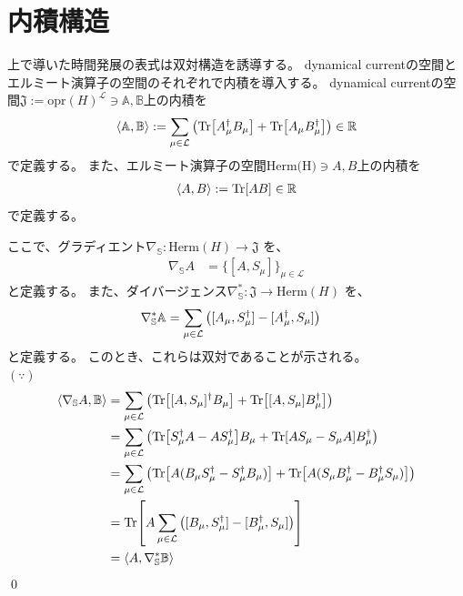\documentclass[a4paper,11pt]{jsarticle}
\numberwithin{equation}{section}
\begin{document}
\section{内積構造}
上で導いた時間発展の表式は双対構造を誘導する。
dynamical currentの空間とエルミート演算子の空間のそれぞれで内積を導入する。
dynamical currentの空間$\mathfrak{J}:= \text{opr}(H)^{\mathcal{L}} \ni \mathbb{A},\mathbb{B}$上の内積を
\begin{align}
    \ev{\mathbb{A} , \mathbb{B}} := \sum_{\mu \in \mathcal{L}} \qty(\Tr[ A_{\mu}^{\dagger} B_{\mu}] + \Tr[A_{\mu} B_{\mu}^{\dagger}]) \in \mathbb{R}
\end{align} 
で定義する。
また、エルミート演算子の空間$\text{Herm(H)} \ni A,B$上の内積を
\begin{align}
    \ev{A, B} := \Tr[A B] \in \mathbb{R}
\end{align}
で定義する。

ここで、グラディエント$\nabla_{\mathbb{S}} : \text{Herm}(H) \to \mathfrak{J}$
を、
\begin{align}
    \nabla_{\mathbb{S}} A &= \{[A, S_{\mu}]\}_{\mu \in \mathcal{L}}
\end{align}
と定義する。
また、ダイバージェンス$\nabla^*_{\mathbb{S}} : \mathfrak{J} \to \text{Herm}(H)$
を、
\begin{align}
    \nabla^*_{\mathbb{S}} \mathbb{A}&=  \sum_{\mu \in \mathcal{L}} \qty([A_{\mu}, S_{\mu}^{\dagger}] - [A_{\mu}^{\dagger}, S_{\mu}])
\end{align}
と定義する。
このとき、これらは双対であることが示される。\\
$(\because)$\\
\begin{align}
    \ev{\nabla_{\mathbb{S}} A , \mathbb{B}} &= \sum_{\mu \in \mathcal{L}} \qty( \Tr[ [A, S_{\mu}]^{\dagger} B_{\mu}] + \Tr[ [A, S_{\mu}] B_{\mu}^{\dagger}]) \\
    &= \sum_{\mu \in \mathcal{L}} \qty( \Tr[ S_{\mu}^{\dagger} A- AS_{\mu}^{\dagger}] B_{\mu} + \Tr[AS_{\mu} - S_{\mu} A] B_{\mu}^{\dagger}) \\
    &= \sum_{\mu \in \mathcal{L}} \qty( \Tr[ A (B_{\mu} S_{\mu}^{\dagger} - S_{\mu}^{\dagger} B_{\mu})] + \Tr[ A (S_{\mu} B_{\mu}^{\dagger} - B_{\mu}^{\dagger} S_{\mu})]) \\
    &= \Tr[ A \sum_{\mu \in \mathcal{L}} \qty( [B_{\mu}, S_{\mu}^{\dagger}] - [B_{\mu}^{\dagger}, S_{\mu}])] \\
    &= \ev{A, \nabla^*_{\mathbb{S}} \mathbb{B}}
\end{align}
\qed\\
\end{document}
